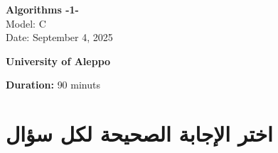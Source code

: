 \documentclass[12pt]{article}
\begin{document}
\begin{flushright}
{\Large \textbf{{\textenglish{Algorithms -1-}}}}\\[0.25em]
{\normalsize \textenglish{Model: }{\textenglish{C}}}\\[0.1em]
{\normalsize \textenglish{Date: }{\textenglish{September 4, 2025}}}
\end{flushright}

\vspace{0.6cm}

\noindent
\begin{minipage}[t]{0.65\textwidth}
  \raggedright
  \textbf{{\textenglish{University of Aleppo}}}\\[0.3em]
\end{minipage}\hfill
\begin{minipage}[t]{0.3\textwidth}
  \raggedleft
  \textenglish{\textbf{Duration: }}{\textenglish{90 minuts}}
\end{minipage}

\vspace{0.9cm}

\section*{اختر الإجابة الصحيحة لكل سؤال}
\end{document}
